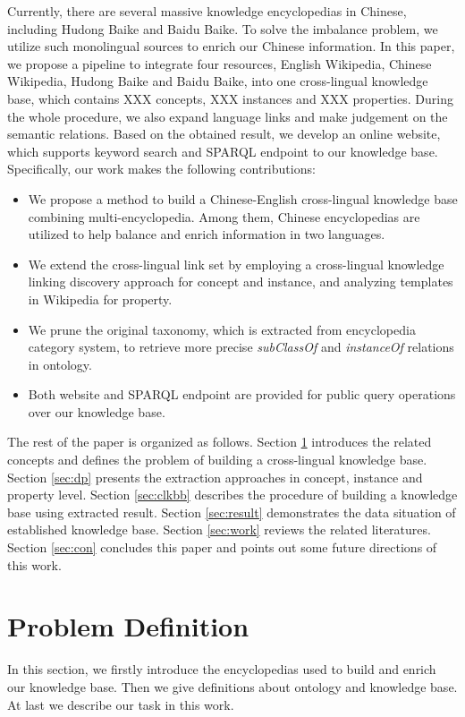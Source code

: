 \documentclass[runningheads,a4paper]{llncs}
\begin{document}
Currently, there are several massive knowledge encyclopedias in Chinese, including Hudong Baike and Baidu Baike. To solve the imbalance problem, we utilize such monolingual sources to enrich our Chinese information. In this paper, we propose a pipeline to integrate four resources, English Wikipedia, Chinese Wikipedia, Hudong Baike and Baidu Baike, into one cross-lingual knowledge base, which contains XXX concepts, XXX instances and XXX properties. During the whole procedure, we also expand language links and make judgement on the semantic relations. Based on the obtained result, we develop an online website, which supports keyword search and SPARQL endpoint to our knowledge base. Specifically, our work makes the following contributions:
\begin{itemize}
  \item We propose a method to build a Chinese-English cross-lingual knowledge base combining multi-encyclopedia. Among them, Chinese encyclopedias are utilized to help balance and enrich information in two languages.
  \item We extend the cross-lingual link set by employing a cross-lingual knowledge linking discovery approach for concept and instance, and analyzing templates in Wikipedia for property.
  \item We prune the original taxonomy, which is extracted from encyclopedia category system, to retrieve more precise \textit{subClassOf} and \textit{instanceOf} relations in ontology.
  \item Both website and SPARQL endpoint are provided for public query operations over our knowledge base.
\end{itemize}

The rest of the paper is organized as follows. Section \ref{sec:pd} introduces the related concepts and defines the problem of building a cross-lingual knowledge base. Section \ref{sec:dp} presents the extraction approaches in concept, instance and property level. Section \ref{sec:clkbb} describes the procedure of building a knowledge base using extracted result. Section \ref{sec:result} demonstrates the data situation of established knowledge base. Section \ref{sec:work} reviews the related literatures. Section \ref{sec:con} concludes this paper and points out some future directions of this work.

\section{Problem Definition}
\label{sec:pd}
In this section, we firstly introduce the encyclopedias used to build and enrich our knowledge base. Then we give definitions about ontology and knowledge base. At last we describe our task in this work.
\end{document}
